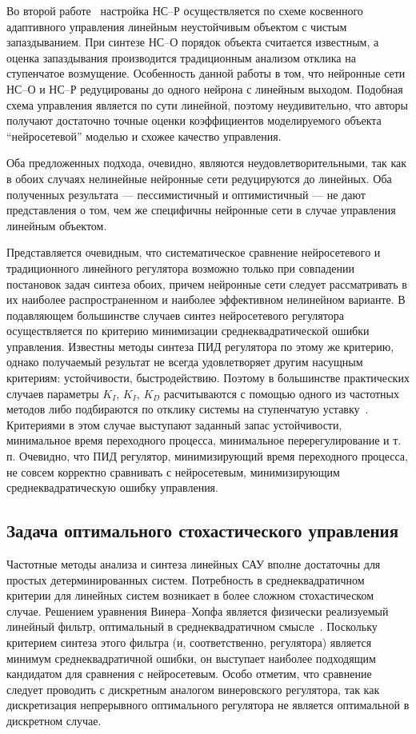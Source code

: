 Во второй работе~\cite{toudeft} настройка НС--Р осуществляется по
схеме косвенного адаптивного управления линейным неустойчивым объектом
с чистым запаздыванием.  При синтезе НС--О порядок объекта считается
известным, а оценка запаздывания производится традиционным анализом
отклика на ступенчатое возмущение.  Особенность данной работы в том,
что нейронные сети НС--О и НС--Р редуцированы до одного нейрона с
линейным выходом.  Подобная схема управления является по сути
линейной, поэтому неудивительно, что авторы получают достаточно точные
оценки коэффициентов моделируемого объекта ``нейросетевой'' моделью и
схожее качество управления.

Оба предложенных подхода, очевидно, являются неудовлетворительными,
так как в обоих случаях нелинейные нейронные сети редуцируются до
линейных.  Оба полученных результата --- пессимистичный и
оптимистичный --- не дают представления о том, чем же специфичны
нейронные сети в случае управления линейным объектом.

Представляется очевидным, что систематическое сравнение нейросетевого
и традиционного линейного регулятора возможно только при совпадении
постановок задач синтеза обоих, причем нейронные сети следует
рассматривать в их наиболее распространенном и наиболее эффективном
нелинейном варианте.  В подавляющем большинстве случаев синтез
нейросетевого регулятора осуществляется по критерию минимизации
среднеквадратической ошибки управления.  Известны методы синтеза ПИД
регулятора по этому же критерию, однако получаемый результат не всегда
удовлетворяет другим насущным критериям: устойчивости, быстродействию.
Поэтому в большинстве практических случаев параметры $K_I$, $K_I$,
$K_D$ расчитываются с помощью одного из частотных методов либо
подбираются по отклику системы на ступенчатую
уставку~\cite{kurop73}\cite{netush68}.  Критериями в этом случае
выступают заданный запас устойчивости, минимальное время переходного
процесса, минимальное перерегулирование и т. п.  Очевидно, что ПИД
регулятор, минимизирующий время переходного процесса, не совсем
корректно сравнивать с нейросетевым, минимизирующим среднеквадратическую
ошибку управления.

\subsection{Задача оптимального стохастического управления}

Частотные методы анализа и синтеза линейных САУ вполне достаточны для
простых детерминированных систем.  Потребность в среднеквадратичном
критерии для линейных систем возникает в более сложном стохастическом
случае.  Решением уравнения Винера--Хопфа является физически
реализуемый линейный фильтр, оптимальный в среднеквадратичном
смысле~\cite{solod60}\cite{skliar65}\cite{ostrem73}\cite{tsipkin58}.
Поскольку критерием синтеза этого фильтра (и, соответственно,
регулятора) является минимум среднеквадратичной ошибки, он выступает
наиболее подходящим кандидатом для сравнения с нейросетевым.  Особо
отметим, что сравнение следует проводить с дискретным аналогом
винеровского регулятора, так как дискретизация непрерывного
оптимального регулятора не является оптимальной в дискретном случае.


